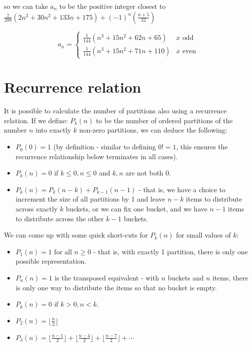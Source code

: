 \documentclass{article}
\begin{document}
so we can take $a_n$ to be the positive integer closest to $\frac{1}{288}(2n^3 + 30n^2 + 133n + 175) + (-1)^n(\frac{n+5}{32})$

\[
	a_n = 
	\begin{cases}
		\frac{1}{144} (n^3 + 15 n^2 + 62 n + 65) & x \text{ odd} \\
		\frac{1}{144} (n^3 + 15 n^2 + 71 n + 110) & x \text{ even}
	\end{cases}
\]

\section{Recurrence relation}

It is possible to calculate the number of partitions also using a recurrence relation. If we define:
$P_k(n)$ to be the number of ordered partitions of the number $n$ into exactly $k$ non-zero partitions, we can deduce the following:
\begin{itemize}
    \item $P_0(0) = 1$ (by definition - similar to defining $0! = 1$, this ensures the recurrence relationship below terminates in all cases).
    \item $P_k(n) = 0$ if $k\leq 0, n\leq 0$ and $k,n$ are not both $0$.
    \item $P_k(n) = P_k(n-k) + P_{k-1}(n-1)$ - that is, we have a choice to increment the size of all partitions by 1 and leave $n-k$ items to distribute across exactly $k$ buckets, or we can fix one bucket, and we have $n-1$ items to distribute across the other $k-1$ buckets.
\end{itemize}

We can come up with some quick short-cuts for $P_k(n)$ for small values of $k$:
\begin{itemize}
    \item $P_1(n) = 1$ for all $n \geq 0$ - that is, with exactly 1 partition, there is only one possible representation.
    \item $P_n(n) = 1$ is the transposed equivalent - with $n$ buckets and $n$ items, there is only one way to distribute the items so that no bucket is empty.
    \item $P_k(n) = 0$ if $k > 0, n< k$.
    \item $P_2(n) = \lfloor \frac{n}{2} \rfloor$
    \item $P_3(n) = \lfloor \frac{n-1}{2} \rfloor + \lfloor \frac{n-4}{2} \rfloor + \lfloor \frac{n-7}{2} \rfloor  + \cdots $
\end{itemize}
\end{document}
